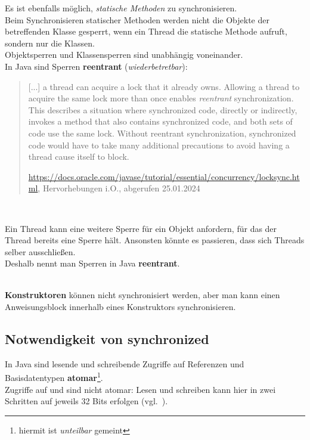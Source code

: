 \noindent
Es ist ebenfalls möglich, \textit{statische Methoden} zu synchronisieren.\\
Beim Synchronisieren statischer Methoden werden nicht die Objekte der betreffenden Klasse gesperrt, wenn ein Thread die statische Methode aufruft, sondern nur die Klassen.\\
Objektsperren und Klassensperren sind unabhängig voneinander.\\

\noindent
In Java sind Sperren \textbf{reentrant} (\textit{wiederbetretbar}):

\blockquote[\url{https://docs.oracle.com/javase/tutorial/essential/concurrency/locksync.html}, Hervorhebungen i.O., abgerufen 25.01.2024]{
     [...] a thread can acquire a lock that it already owns. Allowing a thread to acquire the same lock more than once enables \textit{reentrant} synchronization. This describes a situation where synchronized code, directly or indirectly, invokes a method that also contains synchronized code, and both sets of code use the same lock. Without reentrant synchronization, synchronized code would have to take many additional precautions to avoid having a thread cause itself to block.
}\\


\begin{tcolorbox}[enlarge top by=0.5cm,enlarge bottom by=0.5cm]
    Ein Thread kann eine weitere Sperre für ein Objekt anfordern, für das der Thread bereits eine Sperre hält.
    Ansonsten könnte es passieren, dass sich Threads selber ausschließen.\\
    Deshalb nennt man Sperren in Java \textbf{reentrant}.
\end{tcolorbox}\\


\noindent
\textbf{Konstruktoren} können nicht synchronisiert werden, aber man kann einen Anweisungsblock innerhalb eines Konstruktors synchronisieren.

\subsection*{Notwendigkeit von synchronized}

In Java sind lesende und schreibende Zugriffe auf Referenzen und Basisdatentypen \textbf{atomar}\footnote{
hiermit ist \textit{unteilbar} gemeint
}.\\

\noindent
Zugriffe auf  und  sind nicht atomar: Lesen und schreiben kann hier in zwei Schritten auf jeweils 32 Bits erfolgen (vgl.~\cite[30]{Oec22}).\\

